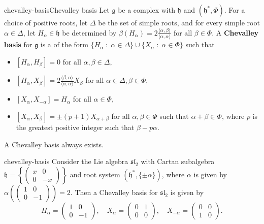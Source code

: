 \begin{topic}{chevalley-basis}{Chevalley basis}
    Let $\mathfrak{g}$ be a  complex  with  $\mathfrak{h}$ and  $(\mathfrak{h}^*, \Phi)$. For a choice of positive roots, let $\Delta$ be the set of simple roots, and for every simple root $\alpha \in \Delta$, let $H_\alpha \in \mathfrak{h}$ be determined by $\beta(H_\alpha) = 2 \frac{\langle \alpha, \beta \rangle}{\langle \alpha, \alpha \rangle}$ for all $\beta \in \Phi$.
    A \textbf{Chevalley basis} for $\mathfrak{g}$ is a  of the form $\{ H_\alpha \;:\; \alpha \in \Delta \} \cup \{ X_\alpha \;:\; \alpha \in \Phi \}$ such that
    \begin{itemize}
        \item $[H_\alpha, H_\beta] = 0$ for all $\alpha, \beta \in \Delta$,
        \item $[H_\alpha, X_\beta] = 2 \frac{\langle \beta, \alpha \rangle}{\langle \alpha, \alpha \rangle} X_\beta$ for all $\alpha \in \Delta, \beta \in \Phi$,
        \item $[X_\alpha, X_{-\alpha}] = H_\alpha$ for all $\alpha \in \Phi$,
        \item $[X_\alpha, X_\beta] = \pm (p + 1) X_{\alpha + \beta}$ for all $\alpha, \beta \in \Phi$ such that $\alpha + \beta \in \Phi$, where $p$ is the greatest positive integer such that $\beta - p \alpha$.
    \end{itemize}
    A Chevalley basis always exists.
\end{topic}

\begin{example}{chevalley-basis}
    Consider the Lie algebra $\mathfrak{sl}_2$ with Cartan subalgebra $\mathfrak{h} = \left\{ \left( \begin{smallmatrix} x & 0 \\ 0 & -x \end{smallmatrix} \right) \right\}$ and root system $(\mathfrak{h}^*, \{ \pm \alpha \})$, where $\alpha$ is given by $\alpha \left( \left( \begin{smallmatrix} 1 & 0 \\ 0 & -1 \end{smallmatrix} \right) \right) = 2$. Then a Chevalley basis for $\mathfrak{sl}_2$ is given by
    \[ H_\alpha = \begin{pmatrix} 1 & 0 \\ 0 & -1 \end{pmatrix}, \quad X_\alpha = \begin{pmatrix} 0 & 1 \\ 0 & 0 \end{pmatrix}, \quad X_{-\alpha} = \begin{pmatrix} 0 & 0 \\ 1 & 0 \end{pmatrix} . \]
\end{example}

